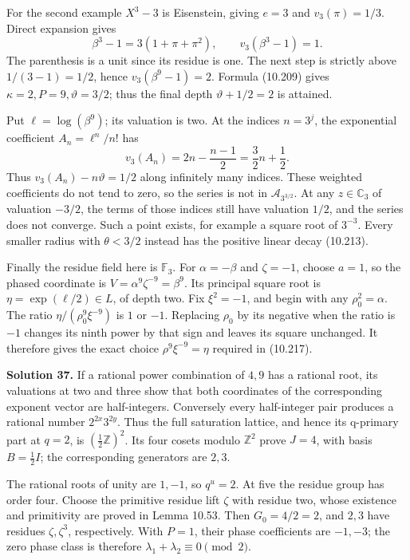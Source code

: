 \documentclass[
  11pt,
  a4paper,
]{article}
\begin{document}
For the second example \(X^3-3\) is Eisenstein, giving \(e=3\) and
\(v_3(\pi)=1/3\). Direct expansion gives \[
\beta^3-1=3(1+\pi+\pi^2),\qquad v_3(\beta^3-1)=1.
\] The parenthesis is a unit since its residue is one. The next step is
strictly above \(1/(3-1)=1/2\), hence \(v_3(\beta^9-1)=2\). Formula
(10.209) gives \(\kappa=2,P=9,\vartheta=3/2\); thus the final depth
\(\vartheta+1/2=2\) is attained.

Put \(\ell=\log(\beta^9)\); its valuation is two. At the indices
\(n=3^j\), the exponential coefficient \(A_n=\ell^n/n!\) has \[
v_3(A_n)=2n-\frac{n-1}{2}=\frac32n+\frac12.
\] Thus \(v_3(A_n)-n\vartheta=1/2\) along infinitely many indices. These
weighted coefficients do not tend to zero, so the series is not in
\(\mathcal A_{3^{3/2}}\). At any \(z\in\mathbb C_3\) of valuation
\(-3/2\), the terms of those indices still have valuation \(1/2\), and
the series does not converge. Such a point exists, for example a square
root of \(3^{-3}\). Every smaller radius with \(\theta<3/2\) instead has
the positive linear decay (10.213).

Finally the residue field here is \(\mathbb F_3\). For \(\alpha=-\beta\)
and \(\zeta=-1\), choose \(a=1\), so the phased coordinate is
\(V=\alpha^9\zeta^{-9}=\beta^9\). Its principal square root is
\(\eta=\exp(\ell/2)\in L\), of depth two. Fix \(\xi^2=-1\), and begin
with any \(\rho_0^2=\alpha\). The ratio \(\eta/(\rho_0^9\xi^{-9})\) is
\(1\) or \(-1\). Replacing \(\rho_0\) by its negative when the ratio is
\(-1\) changes its ninth power by that sign and leaves its square
unchanged. It therefore gives the exact choice \(\rho^9\xi^{-9}=\eta\)
required in (10.217).

\textbf{Solution 37.} If a rational power combination of \(4,9\) has a
rational root, its valuations at two and three show that both
coordinates of the corresponding exponent vector are half-integers.
Conversely every half-integer pair produces a rational number
\(2^{2x}3^{2y}\). Thus the full saturation lattice, and hence its
q-primary part at \(q=2\), is \((\tfrac12\mathbb Z)^2\). Its four cosets
modulo \(\mathbb Z^2\) prove \(J=4\), with basis \(B=\tfrac12I\); the
corresponding generators are \(2,3\).

The rational roots of unity are \(1,-1\), so \(q^u=2\). At five the
residue group has order four. Choose the primitive residue lift
\(\zeta\) with residue two, whose existence and primitivity are proved
in Lemma 10.53. Then \(G_0=4/2=2\), and \(2,3\) have residues
\(\zeta,\zeta^3\), respectively. With \(P=1\), their phase coefficients
are \(-1,-3\); the zero phase class is therefore
\(\lambda_1+\lambda_2\equiv0\pmod2\).
\end{document}
